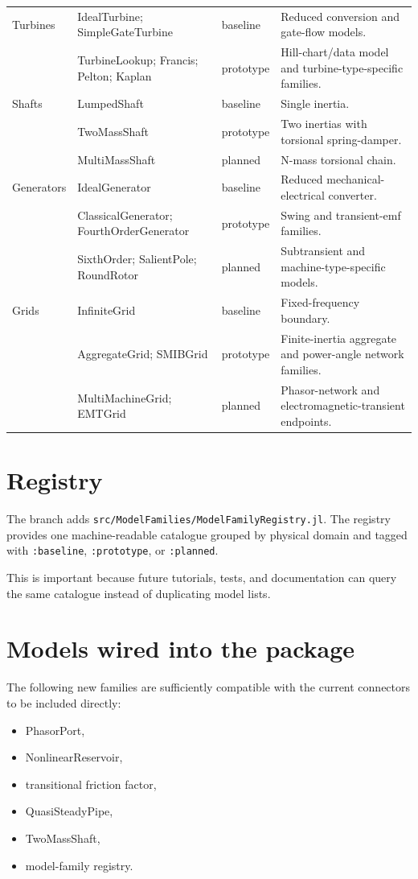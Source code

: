 \documentclass[10pt,a4paper]{article}
\begin{document}
\begin{longtable}{p{2.6cm}p{5.3cm}p{2.1cm}p{5.0cm}}
Turbines &
IdealTurbine; SimpleGateTurbine &
baseline &
Reduced conversion and gate-flow models. \\
&
TurbineLookup; Francis; Pelton; Kaplan &
prototype &
Hill-chart/data model and turbine-type-specific families. \\[0.7ex]

Shafts &
LumpedShaft &
baseline &
Single inertia. \\
&
TwoMassShaft &
prototype &
Two inertias with torsional spring-damper. \\
&
MultiMassShaft &
planned &
N-mass torsional chain. \\[0.7ex]

Generators &
IdealGenerator &
baseline &
Reduced mechanical-electrical converter. \\
&
ClassicalGenerator; FourthOrderGenerator &
prototype &
Swing and transient-emf families. \\
&
SixthOrder; SalientPole; RoundRotor &
planned &
Subtransient and machine-type-specific models. \\[0.7ex]

Grids &
InfiniteGrid &
baseline &
Fixed-frequency boundary. \\
&
AggregateGrid; SMIBGrid &
prototype &
Finite-inertia aggregate and power-angle network families. \\
&
MultiMachineGrid; EMTGrid &
planned &
Phasor-network and electromagnetic-transient endpoints. \\
\bottomrule
\end{longtable}
\normalsize

\section{Registry}
The branch adds \texttt{src/ModelFamilies/ModelFamilyRegistry.jl}. The registry
provides one machine-readable catalogue grouped by physical domain and tagged
with \texttt{:baseline}, \texttt{:prototype}, or \texttt{:planned}.

This is important because future tutorials, tests, and documentation can query
the same catalogue instead of duplicating model lists.

\section{Models wired into the package}
The following new families are sufficiently compatible with the current
connectors to be included directly:
\begin{itemize}
\item PhasorPort,
\item NonlinearReservoir,
\item transitional friction factor,
\item QuasiSteadyPipe,
\item TwoMassShaft,
\item model-family registry.
\end{itemize}
\end{document}
